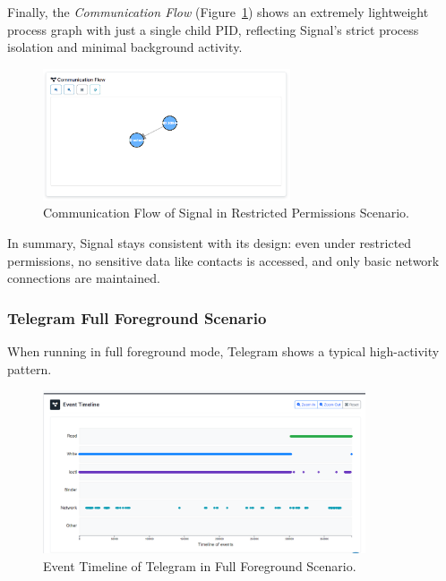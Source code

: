 \documentclass[a4paper,12pt]{report}
\begin{document}
Finally, the \textit{Communication Flow} (Figure~\ref{fig:signal-none-flow}) shows an extremely lightweight process graph with just a single child PID, reflecting Signal’s strict process isolation and minimal background activity.

\begin{figure}[H]
    \centering
    \includegraphics[width=0.65\textwidth]{signal-none-flow.png}
    \caption{Communication Flow of Signal in Restricted Permissions Scenario.}
    \label{fig:signal-none-flow}
\end{figure}

In summary, Signal stays consistent with its design: even under restricted permissions, no sensitive data like contacts is accessed, and only basic network connections are maintained.



\subsubsection{Telegram Full Foreground Scenario}

When running in full foreground mode, Telegram shows a typical high-activity pattern.

\begin{figure}[H]
    \centering
    \includegraphics[width=0.85\textwidth]{telegram-full-events.png}
    \caption{Event Timeline of Telegram in Full Foreground Scenario.}
    \label{fig:telegram-full-events}
\end{figure}
\end{document}
